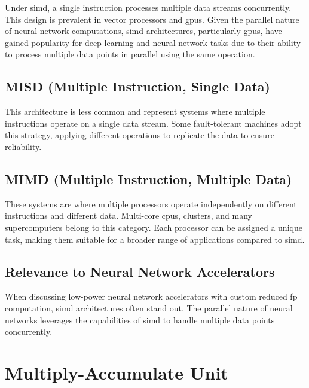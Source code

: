 Under \gls{simd}, a single instruction processes multiple data streams concurrently. This design is prevalent in vector processors and \glspl{gpu}. Given the parallel nature of neural network computations, \gls{simd} architectures, particularly \glspl{gpu}, have gained popularity for deep learning and neural network tasks due to their ability to process multiple data points in parallel using the same operation.

\subsection*{MISD (Multiple Instruction, Single Data)}

This architecture is less common and represent systems where multiple instructions operate on a single data stream. Some fault-tolerant machines adopt this strategy, applying different operations to replicate the data to ensure reliability.

\subsection*{MIMD (Multiple Instruction, Multiple Data)}

These systems are where multiple processors operate independently on different instructions and different data. Multi-core \glspl{cpu}, clusters, and many supercomputers belong to this category. Each processor can be assigned a unique task, making them suitable for a broader range of applications compared to \gls{simd}.

\subsection*{Relevance to Neural Network Accelerators}

When discussing low-power neural network accelerators with custom reduced \gls{fp} computation, \gls{simd} architectures often stand out. The parallel nature of neural networks leverages the capabilities of \gls{simd} to handle multiple data points concurrently.

\section{Multiply-Accumulate Unit}

